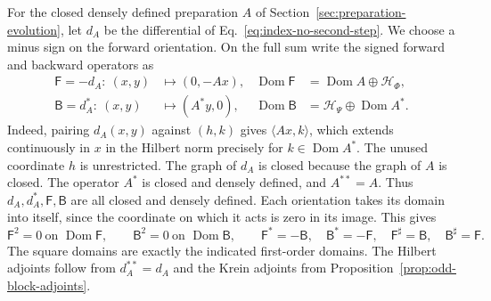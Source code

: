 \documentclass[11pt]{article}
\theoremstyle{definition}
\begin{document}
For the closed densely defined preparation $A$ of Section~\ref{sec:preparation-evolution}, let $d_A$ be the differential of Eq.~\eqref{eq:index-no-second-step}. We choose a minus sign on the forward orientation. On the full sum write the signed forward and backward operators as
\begin{equation}
\begin{aligned}
 \mathsf F=-d_A:\ (x,y)&\longmapsto(0,-Ax),
 &\operatorname{Dom}\mathsf F&=\operatorname{Dom}A\oplus\mathcal H_\Phi,\\
 \mathsf B=d_A^*:\ (x,y)&\longmapsto(A^*y,0),
 &\operatorname{Dom}\mathsf B&=\mathcal H_\Psi\oplus\operatorname{Dom}A^*.
\end{aligned}
 \label{eq:oriented-extensions}
\end{equation}
Indeed, pairing $d_A(x,y)$ against $(h,k)$ gives $\langle Ax,k\rangle$, which extends continuously in $x$ in the Hilbert norm precisely for $k\in\operatorname{Dom}A^*$. The unused coordinate $h$ is unrestricted. The graph of $d_A$ is closed because the graph of $A$ is closed. The operator $A^*$ is closed and densely defined, and $A^{**}=A$. Thus $d_A,d_A^*,\mathsf F,\mathsf B$ are all closed and densely defined. Each orientation takes its domain into itself, since the coordinate on which it acts is zero in its image. This gives
\begin{equation}
 \mathsf F^2=0\ \text{on }\operatorname{Dom}\mathsf F,\qquad
 \mathsf B^2=0\ \text{on }\operatorname{Dom}\mathsf B,\qquad
 \mathsf F^*=-\mathsf B,\quad \mathsf B^*=-\mathsf F,\quad
 \mathsf F^\sharp=\mathsf B,\quad \mathsf B^\sharp=\mathsf F .
 \label{eq:oriented-adjoints}
\end{equation}
The square domains are exactly the indicated first-order domains. The Hilbert adjoints follow from $d_A^{**}=d_A$ and the Krein adjoints from Proposition~\ref{prop:odd-block-adjoints}.
\end{document}
